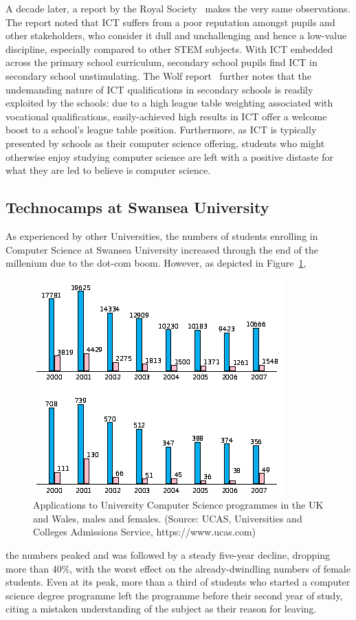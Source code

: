 \documentclass{sig-alternate}
\begin{document}
A decade later, a report by the Royal Society~\cite{RoyalSoc:2012}
makes the very same observations.  The report noted that ICT suffers
from a poor reputation amongst pupils and other stakeholders, who
consider it dull and unchallenging and hence a low-value discipline,
especially compared to other STEM subjects.  With ICT embedded across
the primary school curriculum, secondary school pupils find ICT in
secondary school unstimulating.  The Wolf report~\cite{Wolf:2011}
further notes that the undemanding nature of ICT qualifications in
secondary schools is readily exploited by the schools: due to a high
league table weighting associated with vocational qualifications,
easily-achieved high results in ICT offer a welcome boost to a
school's league table position.  Furthermore, as ICT is typically
presented by schools as their computer science offering, students who
might otherwise enjoy studying computer science are left with a
positive distaste for what they are led to believe is computer science.

\subsection{Technocamps at Swansea University}
As experienced by other Universities,
the numbers of students enrolling in Computer Science
at Swansea University increased through the end
of the millenium due to the dot-com boom.
However, as depicted in Figure~\ref{fig:numbers},
\begin{figure}
  \centering
  \includegraphics[width=0.9\columnwidth]{images/numbers.png}
  \caption{Applications to University Computer Science programmes
           in the UK and Wales, males and females.
           (Source: UCAS, Universities and Colleges Admissions Service,
            https://www.ucas.com)}
  \label{fig:numbers}
\end{figure}
the numbers peaked and was followed by
a steady five-year decline, dropping more than 40\%,
with the worst effect on the already-dwindling numbers
of female students.
Even at its peak, more than a third of students who
started a computer science degree programme left
the programme before their second year of study,
citing a mistaken understanding of the subject
as their reason for leaving.
\end{document}
